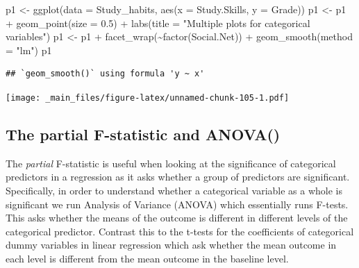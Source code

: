 \documentclass[
]{gitbook}
\newenvironment{Shaded}{\begin{snugshade}}{\end{snugshade}}
\newcommand{\AttributeTok}[1]{\textcolor[rgb]{0.77,0.63,0.00}{#1}}
\newcommand{\FloatTok}[1]{\textcolor[rgb]{0.00,0.00,0.81}{#1}}
\newcommand{\FunctionTok}[1]{\textcolor[rgb]{0.00,0.00,0.00}{#1}}
\newcommand{\NormalTok}[1]{#1}
\newcommand{\OtherTok}[1]{\textcolor[rgb]{0.56,0.35,0.01}{#1}}
\newcommand{\SpecialCharTok}[1]{\textcolor[rgb]{0.00,0.00,0.00}{#1}}
\newcommand{\StringTok}[1]{\textcolor[rgb]{0.31,0.60,0.02}{#1}}
\begin{document}
\begin{Shaded}
\begin{Highlighting}[]
\NormalTok{p1 }\OtherTok{\textless{}{-}} \FunctionTok{ggplot}\NormalTok{(}\AttributeTok{data =}\NormalTok{ Study\_habits, }\FunctionTok{aes}\NormalTok{(}\AttributeTok{x =}\NormalTok{ Study.Skills, }\AttributeTok{y =}\NormalTok{ Grade))}
\NormalTok{p1 }\OtherTok{\textless{}{-}}\NormalTok{ p1 }\SpecialCharTok{+} \FunctionTok{geom\_point}\NormalTok{(}\AttributeTok{size =} \FloatTok{0.5}\NormalTok{) }\SpecialCharTok{+} \FunctionTok{labs}\NormalTok{(}\AttributeTok{title =} \StringTok{"Multiple plots for categorical variables"}\NormalTok{)}
\NormalTok{p1 }\OtherTok{\textless{}{-}}\NormalTok{ p1 }\SpecialCharTok{+} \FunctionTok{facet\_wrap}\NormalTok{(}\SpecialCharTok{\textasciitilde{}}\FunctionTok{factor}\NormalTok{(Social.Net)) }\SpecialCharTok{+} \FunctionTok{geom\_smooth}\NormalTok{(}\AttributeTok{method =} \StringTok{"lm"}\NormalTok{)}
\NormalTok{p1}
\end{Highlighting}
\end{Shaded}

\begin{verbatim}
## `geom_smooth()` using formula 'y ~ x'
\end{verbatim}

\texttt{[image: \_main\_files/figure-latex/unnamed-chunk-105-1.pdf]}


\hypertarget{the-partial-f-statistic-and-anova}{%
\subsection{The partial F-statistic and ANOVA()}\label{the-partial-f-statistic-and-anova}}

The \emph{partial} F-statistic is useful when looking at the significance of categorical predictors in a regression as it asks whether a group of predictors are significant. Specifically, in order to understand whether a categorical variable as a whole is significant we run Analysis of Variance (ANOVA) which essentially runs F-tests. This asks whether the means of the outcome is different in different levels of the categorical predictor. Contrast this to the t-tests for the coefficients of categorical dummy variables in linear regression which ask whether the mean outcome in each level is different from the mean outcome in the baseline level.
\end{document}

